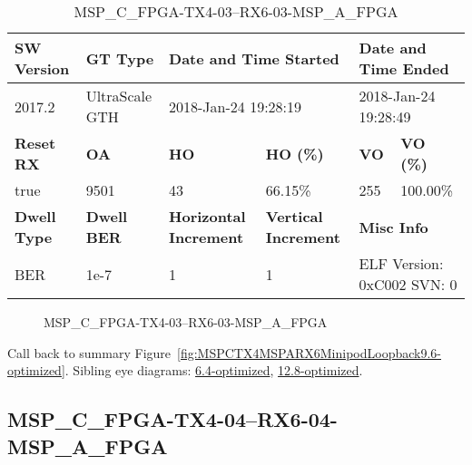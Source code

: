 \begin{table}[h]
\centering
\caption{MSP\_C\_FPGA-TX4-03--RX6-03-MSP\_A\_FPGA}
\label{tab:MSPCFPGATX403RX603MSPAFPGA9.6-optimized}
\begin{tabular}{@{}|l|l|l|l|l|l|@{}}
\toprule
\textbf{SW Version}                & \textbf{GT Type}   & \multicolumn{2}{l|}{\textbf{Date and Time Started}}            & \multicolumn{2}{l|}{\textbf{Date and Time Ended}}        \\ \midrule
2017.2                       & UltraScale GTH          & \multicolumn{2}{l|}{2018-Jan-24 19:28:19}                   & \multicolumn{2}{l|}{2018-Jan-24 19:28:49}               \\ \midrule
\textbf{Reset RX}                  & \textbf{OA} & \textbf{HO}   & \textbf{HO (\%)} & \textbf{VO} & \textbf{VO (\%)} \\ \midrule
true & 9501        & 43          & 66.15\%        & 255        & 100.00\%       \\ \midrule
\textbf{Dwell Type}                & \textbf{Dwell BER} & \textbf{Horizontal Increment} & \textbf{Vertical Increment}    & \multicolumn{2}{l|}{\textbf{Misc Info}}                  \\ \midrule
BER                            & 1e-7        & 1        & 1           & \multicolumn{2}{l|}{ELF Version: 0xC002 SVN: 0}                         \\ \bottomrule
\end{tabular}
\end{table}

\begin{figure}[h]
\caption{MSP\_C\_FPGA-TX4-03--RX6-03-MSP\_A\_FPGA} \label{fig:MSPCFPGATX403RX603MSPAFPGA9.6-optimized}
\end{figure}

Call back to summary Figure~\ref{fig:MSPCTX4MSPARX6MinipodLoopback9.6-optimized}.
Sibling eye diagrams: \hyperref[sec:MSPCFPGATX403RX603MSPAFPGA6.4-optimized]{6.4-optimized}, \hyperref[sec:MSPCFPGATX403RX603MSPAFPGA12.8-optimized]{12.8-optimized}.

\clearpage
\newpage


\subsection{MSP\_C\_FPGA-TX4-04--RX6-04-MSP\_A\_FPGA}\label{sec:MSPCFPGATX404RX604MSPAFPGA9.6-optimized}

